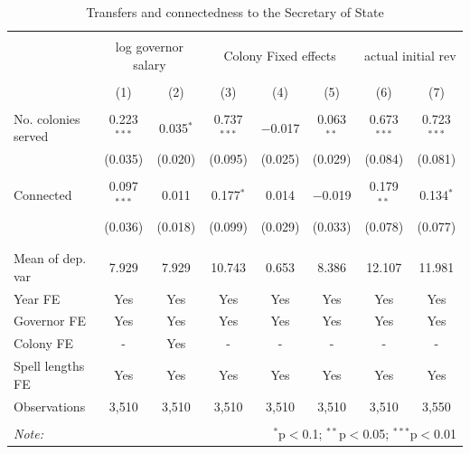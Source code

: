 \documentclass[a4paper]{article}\usepackage[]{graphicx}\usepackage[]{xcolor}
\begin{document}
\begin{table}[!htbp] \centering 
  \caption{Transfers and connectedness to the Secretary of State} 
  \label{tab:tran} 
\scriptsize 
\begin{tabular}{@{\extracolsep{5pt}}lccccccc} 
\\[-1.8ex]\hline 
\hline \\[-1.8ex] 
 & \multicolumn{2}{c}{log governor salary} & \multicolumn{3}{c}{Colony Fixed effects} & \multicolumn{2}{c}{actual initial rev} \\ 
\\[-1.8ex] & (1) & (2) & (3) & (4) & (5) & (6) & (7)\\ 
\hline \\[-1.8ex] 
 No. colonies served & 0.223$^{***}$ & 0.035$^{*}$ & 0.737$^{***}$ & $-$0.017 & 0.063$^{**}$ & 0.673$^{***}$ & 0.723$^{***}$ \\ 
  & (0.035) & (0.020) & (0.095) & (0.025) & (0.029) & (0.084) & (0.081) \\ 
  & & & & & & & \\ 
 Connected & 0.097$^{***}$ & 0.011 & 0.177$^{*}$ & 0.014 & $-$0.019 & 0.179$^{**}$ & 0.134$^{*}$ \\ 
  & (0.036) & (0.018) & (0.099) & (0.029) & (0.033) & (0.078) & (0.077) \\ 
  & & & & & & & \\ 
\hline \\[-1.8ex] 
Mean of dep. var & 7.929 & 7.929 & 10.743 & 0.653 & 8.386 & 12.107 & 11.981 \\ 
Year FE & Yes & Yes & Yes & Yes & Yes & Yes & Yes \\ 
Governor FE & Yes & Yes & Yes & Yes & Yes & Yes & Yes \\ 
Colony FE & - & Yes & - & - & - & - & - \\ 
Spell lengths FE & Yes & Yes & Yes & Yes & Yes & Yes & Yes \\ 
Observations & 3,510 & 3,510 & 3,510 & 3,510 & 3,510 & 3,510 & 3,550 \\ 
\hline 
\hline \\[-1.8ex] 
\textit{Note:}  & \multicolumn{7}{r}{$^{*}$p$<$0.1; $^{**}$p$<$0.05; $^{***}$p$<$0.01} \\ 
\end{tabular} 
\end{table} 
\end{document}
